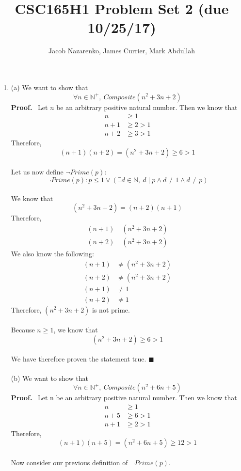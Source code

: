 \documentclass{article}
\title{CSC165H1 Problem Set 2 (due 10/25/17)}
\author{Jacob Nazarenko, James Currier, Mark Abdullah}
\newcommand{\N}{\mathbb{N}}
\begin{document}
\maketitle
\begin{enumerate}
	\item (a) We want to show that $$\forall n \in \N^+,\ Composite(n^2+3n+2)$$
	\textbf{Proof.} \ Let $n$ be an arbitrary positive natural number. Then we know that \\
	\begin{align*}
		n &\geq 1\\
		n+1 &\geq 2 > 1\\
		n+2 &\geq 3 > 1
	\end{align*}
	Therefore, $$(n+1)(n+2) = (n^2+3n+2) \geq 6 > 1$$\\
	Let us now define $\neg Prime(p)$: $$\neg Prime(p): p \leq 1 \vee (\exists d \in \N,\ d \mid p \wedge d \neq 1 \wedge d \neq p)$$\\
	We know that $$(n^2+3n+2) = (n+2)(n+1)$$
	Therefore, 
	\begin{align*}
		(n+1) &\mid (n^2+3n+2)\\
		(n+2) &\mid (n^2+3n+2)
	\end{align*}
	We also know the following:
	\begin{align*}
		(n+1) &\neq (n^2+3n+2)\\
		(n+2) &\neq (n^2+3n+2)\\
		(n+1) &\neq 1\\
		(n+2) &\neq 1
	\end{align*}
	Therefore, $(n^2+3n+2)$ is not prime. \\\\
	Because $n \geq 1$, we know that $$(n^2+3n+2) \geq 6 > 1$$\\
	We have therefore proven the statement true. \null\hfill $\blacksquare$\\\\
	(b) We want to show that $$\forall n \in \N^+,\ Composite(n^2+6n+5)$$
	\textbf{Proof.} \ Let n be an arbitrary positive natural number. Then we know that
	\begin{align*}
		n &\geq 1\\
		n+5 &\geq 6 > 1\\
		n+1 &\geq 2 > 1
	\end{align*}
	Therefore, $$(n+1)(n+5) = (n^2+6n+5) \geq 12 > 1$$\\
	Now consider our previous definition of $\neg Prime(p)$. \\\\

\end{enumerate}
\end{document}
